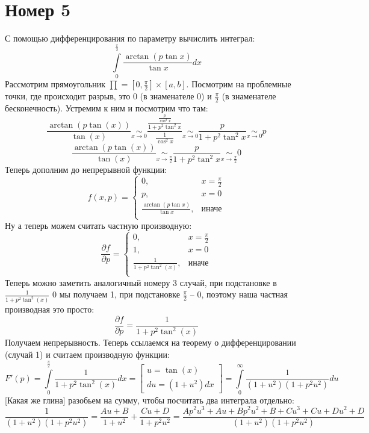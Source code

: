 \documentclass[a4paper,12pt]{article}
\begin{document}
\section*{Номер 5}
С помощью дифференцирования по параметру вычислить интеграл:
\[
\int\limits_0^{\frac{\pi}{2}} \frac{\arctan (p \tan x)}{\tan x} dx
\]
Рассмотрим прямоугольник $\prod = [0, \frac{\pi}{2}] \times [a, b]$. Посмотрим на проблемные точки, где происходит разрыв, это 0 (в знаменателе 0) и $\frac{\pi}{2}$ (в знаменателе бесконечность). Устремим к ним и посмотрим что там:
\[
\frac{\arctan (p \tan (x))}{\tan (x)}  \underset{x \rightarrow 0}{\sim} \frac{\frac{\frac{p}{\cos^2x}}{1 + p^2\tan^2x}}{\frac{1}{\cos^2x}} \underset{x \rightarrow 0}{\sim}  \frac{p}{1 + p^2 \tan^2 x} \underset{x \rightarrow 0}{\sim}  p
 \]
\[
\frac{\arctan (p \tan (x))}{\tan (x)}  \underset{x \rightarrow \frac{\pi}{2}}{\sim} \frac{p}{1 + p^2 \tan^2 x}  \underset{x \rightarrow \frac{\pi}{2}}{\sim} 0 
\]
Теперь дополним до непрерывной функции:
\[
f(x, p) = 
\begin{cases}
0, &x = \frac{\pi}{2} \\
p, &x = 0 \\
 \frac{\arctan (p \tan x)}{\tan x}, &\text{иначе} \\
\end{cases}
\]
Ну а теперь можем считать частную производную:
\[
\frac{\partial f}{\partial p} =
\begin{cases}
0, &x = \frac{\pi}{2} \\
1, &x = 0 \\
\frac{1}{1 + p^2 \tan^2 (x)}, &\text{иначе} \\
\end{cases}
\]
Теперь можно заметить аналогичный номеру 3 случай, при подстановке в $\frac{1}{1 + p^2 \tan^2 (x)}$ 0 мы получаем 1, при подстановке $\frac{\pi}{2}$ -- 0, поэтому наша частная производная это просто:
\[
\frac{\partial f}{\partial p} = \frac{1}{1 + p^2 \tan^2 (x)}
\]
Получаем непрерывность. Теперь ссылаемся на теорему о дифференцировании (случай 1) и считаем производную функции:
\[
F'(p) = \int\limits_0^{\frac{\pi}{2}} \frac{1}{1 + p^2 \tan^2 (x)} dx =
\begin{bmatrix}
u = \tan (x) \\
du = (1 + u^2) dx 
\end{bmatrix} = 
\int\limits_0^{\infty} \frac{1}{(1 + u^2) (1 + p^2 u^2)} du
\]
[Какая же глина] разобьем на сумму, чтобы посчитать два интеграла отдельно:
\[
\frac{1}{(1 + u^2) (1 + p^2 u^2)} = 
\frac{Au + B}{1 + u^2} + \frac{Cu + D}{1 +p^2u^2} =
 \frac{Ap^2u^3 + Au + Bp^2u^2 + B + Cu^3 + Cu +Du^2 + D}{(1 + u^2) (1 + p^2 u^2)}
\]
\end{document}
